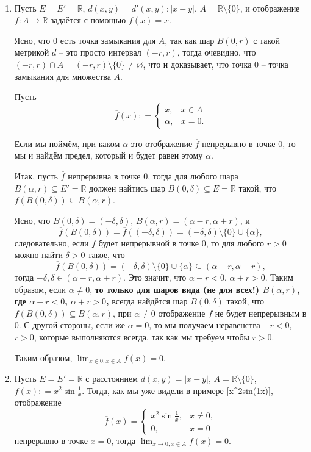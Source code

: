 \begin{example}~

 \begin{enumerate}
  \item Пусть $E = E'=\mathbb{R}$, $d(x,y) = d'(x,y): |x-y|$, $A = \mathbb{R}\setminus \{0\}$, и отображение $f: A \to \mathbb{R}$ задаётся с помощью $f(x) = x$. 

  Ясно, что $0$ есть точка замыкания для $A$, так как шар $B(0,r)$ с такой метрикой $d$ -- это просто интервал $(-r,r)$, тогда очевидно, что $(-r, r) \cap A = (-r, r)\setminus \{0\} \ne \varnothing$, что и доказывает, что точка $0$ -- точка замыкания для множества $A$.

  Пусть
  \[
   \overline{f}(x): = \begin{cases}
       x, & x \in A \\
       \alpha, & x =0.
   \end{cases}
  \]

Если мы поймём, при каком $\alpha$ это отображение $\overline{f}$ непрерывно в точке $0$, то мы и найдём предел, который и будет равен этому $\alpha.$

Итак, пусть $\overline{f}$ непрерывна в точке $0$, тогда для любого шара $B(\alpha, r) \subseteq E' = \mathbb{R}$ должен найтись шар $B(0,\delta) \subseteq E = \mathbb{R}$ такой, что $f(B(0,\delta)) \subseteq B(\alpha, r)$.

Ясно, что $B(0,\delta) = (-\delta, \delta)$, $B(\alpha, r) = (\alpha - r,\alpha + r)$, и 
\[
 \overline{f}(B(0,\delta)) = \overline{f}((-\delta, \delta)) = (-\delta, \delta) \setminus \{0\} \cup \{\alpha\},
\]
следовательно, если $\overline{f}$ будет непрерывной в точке $0$, то для любого $r >0$ можно найти $\delta >0$ такое, что
\[
 \overline{f}(B(0,\delta)) = (-\delta, \delta) \setminus \{0\} \cup \{\alpha\} \subseteq (\alpha - r, \alpha + r),
\]
тогда $-\delta, \delta \in (\alpha - r, \alpha + r)$. Это значит, что $\alpha -r < 0$, $\alpha + r >0$. Таким образом, если $\alpha \ne 0$, \textbf{то только для шаров вида (\ie не для всех!) $B(\alpha, r)$, где $\alpha -r < 0$, $\alpha + r >0$,} всегда найдётся шар $B(0,\delta)$ такой, что $f(B(0,\delta)) \subseteq B(\alpha, r)$, \ie при $\alpha \ne 0$ отображение $\overline{f}$ не будет непрерывным в $0$. С другой стороны, если же $\alpha =0$, то мы получаем неравенства $-r <0$, $r>0$, которые выполняются всегда, так как мы требуем чтобы $r>0$.

Таким образом, $\lim_{x\in 0, x \in A}f(x) = 0.$

 \item Пусть $E = E' = \mathbb{R}$ с расстоянием $d(x,y) = |x-y|$, $A = \mathbb{R}\setminus \{0\}$, $f(x): = x^2 \sin \frac{1}{x}.$ Тогда, как мы уже видели в примере \ref{x^2sin(1x)}, отображение  
     \[
     \overline{f}(x) = \begin{cases}
         x^2 \sin \frac{1}{x}, & x \ne 0, \\
         0, & x =0
     \end{cases}
    \]
    непрерывно в точке $x = 0$, тогда $\lim_{x \to 0, x \in A}f(x) = 0.$
 \end{enumerate}
    
\end{example}


